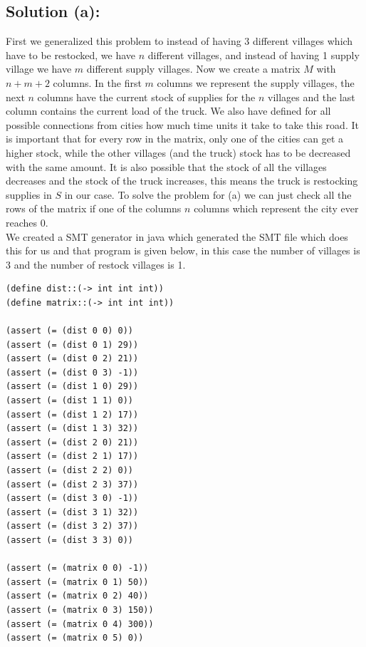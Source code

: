 \documentclass[12pt]{article}
\begin{document}
{\subsection*{Solution (a):}
First we generalized this problem to instead of having 3 different villages which have to be restocked, we have $n$ different villages, and instead of having 1 supply village we have $m$ different supply villages. Now we create a matrix $M$ with $n+m+2$ columns. In the first $m$ columns we represent the supply villages, the next $n$ columns have the current stock of supplies for the $n$ villages and the last column contains the current load of the truck. We also have defined for all possible connections from cities how much time units it take to take this road. It is important that for every row in the matrix, only one of the cities can get a higher stock, while the other villages (and the truck) stock has to be decreased with the same amount. It is also possible that the stock of all the villages decreases and the stock of the truck increases, this means the truck is restocking supplies in $S$ in our case. To solve the problem for (a) we can just check all the rows of the matrix if one of the columns $n$ columns which represent the city ever reaches 0.\\
We created a SMT generator in java which generated the SMT file which does this for us and that program is given below, in this case the number of villages  is 3 and the number of restock villages is 1.

{\footnotesize
\begin{verbatim}
(define dist::(-> int int int))
(define matrix::(-> int int int))

(assert (= (dist 0 0) 0))
(assert (= (dist 0 1) 29))
(assert (= (dist 0 2) 21))
(assert (= (dist 0 3) -1))
(assert (= (dist 1 0) 29))
(assert (= (dist 1 1) 0))
(assert (= (dist 1 2) 17))
(assert (= (dist 1 3) 32))
(assert (= (dist 2 0) 21))
(assert (= (dist 2 1) 17))
(assert (= (dist 2 2) 0))
(assert (= (dist 2 3) 37))
(assert (= (dist 3 0) -1))
(assert (= (dist 3 1) 32))
(assert (= (dist 3 2) 37))
(assert (= (dist 3 3) 0))

(assert (= (matrix 0 0) -1))
(assert (= (matrix 0 1) 50))
(assert (= (matrix 0 2) 40))
(assert (= (matrix 0 3) 150))
(assert (= (matrix 0 4) 300))
(assert (= (matrix 0 5) 0))


\end{verbatim}}}
\end{document}
